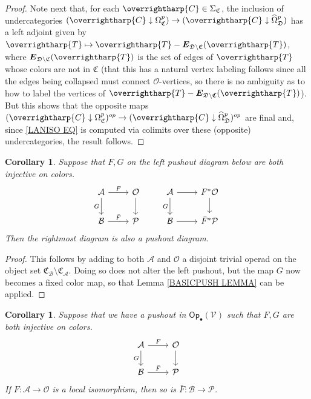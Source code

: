 \documentclass[a4paper,10pt
]{article}%
\numberwithin{equation}{section}
\numberwithin{figure}{section}
\newtheorem{corollary}[equation]{Corollary}%
\theoremstyle{definition} %
\newcommand{\vect}[1]{\text{\overrightharp{\ensuremath{#1}}}}
\newcommand{\Op}{\mathsf{Op}}%
\newcommand{\V}{\ensuremath{\mathcal V}}
\renewcommand{\O}{\ensuremath{\mathcal O}}
\renewcommand{\P}{\ensuremath{\mathcal P}}
\newcommand{\1}{\ensuremath{\mathbbm 1}}%
\begin{document}
\begin{proof}
	Note next that,
	for each $\vect{C} \in \Sigma_{\mathfrak{C}}$,
	the inclusion of undercategories
	$(\vect{C} \downarrow \Omega^p_{\mathfrak{C}})
	\to
	(\vect{C} \downarrow \widehat{\Omega}^p_{\mathfrak{D}})
	$
	has a left adjoint given by  
	$\vect{T} \mapsto \vect{T} - 
	\boldsymbol{E}_{\mathfrak{D} \setminus \mathfrak{C}}(\vect{T})$,
	where 
	$\boldsymbol{E}_{\mathfrak{D} \setminus \mathfrak{C}}(\vect{T})$
	is the set of edges of $\vect{T}$ whose colors are not in $\mathfrak{C}$
	(that this has a natural vertex labeling follows since all the edges being collapsed must connect $\mathcal{O}$-vertices, so there is no ambiguity as to how to label the vertices of $\vect{T} - \boldsymbol{E}_{\mathfrak{D} \setminus \mathfrak{C}}(\vect{T})$).
	But this shows that the opposite maps 
	$(\vect{C} \downarrow \Omega^p_{\mathfrak{C}})^{op}
	\to
	(\vect{C} \downarrow \widehat{\Omega}^p_{\mathfrak{D}})^{op}$
	are final and,
	since \eqref{LANISO EQ} is 
	computed via colimits over these (opposite) undercategories, the result follows.
\end{proof}


\begin{corollary}\label{FGTPUSH_COR}
	Suppose that $F,G$ on the left pushout diagram below are both injective on colors.
	\[
	\begin{tikzcd}
	\mathcal{A} \ar{r}{F} \ar{d}[swap]{G} & \mathcal{O} \ar{d}
	&
	\mathcal{A} \ar{r} \ar{d}[swap]{G} & F^{\**} \mathcal{O} \ar{d}
	\\
	\mathcal{B} \ar{r}{\bar{F}} & \mathcal{P}
	&
	\mathcal{B} \ar{r} & \bar{F}^{\**} \mathcal{P}
	\end{tikzcd}
	\]
	Then the rightmost diagram is also a pushout diagram.
\end{corollary}

\begin{proof}
	This follows by adding to both $\mathcal{A}$ and $\mathcal{O}$ a disjoint trivial operad on the object set
	$\mathfrak{C}_{\mathcal{B}} \setminus \mathfrak{C}_{\mathcal{A}}$.
	Doing so does not alter the left pushout,
	but the map $G$ now becomes a fixed color map,
	so that Lemma \ref{BASICPUSH LEMMA} can be applied.
\end{proof}



\begin{corollary}\label{LOCALISO_COR}
	Suppose that we have a pushout in $\Op_{\bullet}(\V)$ such that $F,G$ are both injective on colors.
	\[
	\begin{tikzcd}
	\mathcal{A} \arrow[d, "G"'] \arrow[r, "F"]
	&
	\O \arrow[d]
	\\
	\mathcal{B} \ar{r}{\bar{F}}
	&
	\P
	\end{tikzcd}
	\]
	If $F\colon \mathcal{A} \to \mathcal{O}$ is a local isomorphism, then so is $\bar{F} \colon \mathcal{B} \to \P$.
\end{corollary}
\end{document}
